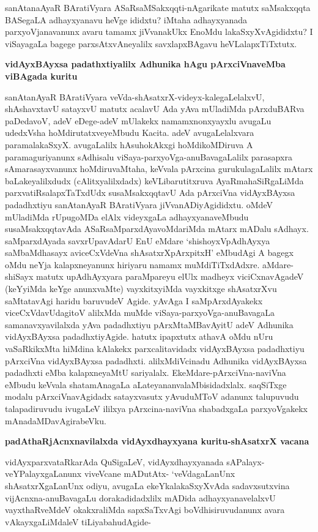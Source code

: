 sanAtanaAyaR BAratiVyara ASaRsaMSakxqqti-nAgarikate matutx saMsakxqqta BASegaLA adhayxyanavu heVge ididxtu? iMtaha adhayxyanada parxyoVjanavanunx avaru tamamx jiVvanakUkx EnoMdu lakaSxyXvAgididxtu? I viSayagaLa bagege parxsAtxvAneyalilx savxlapxBAgavu heVLalapxTiTxtutx.


\textbf{vidAyxBAyxsa padathxtiyalilx Adhunika hAgu pArxciVnaveMba viBAgada kuritu}

sanAtanAyaR BAratiVyara veVda-shAsatxrX-videyx-kalegaLelalxvU, shAshavxtavU satayxvU matutx acalavU Ada yAva mUladiMda pArxduBARva paDedavoV, adeV eDege-adeV mUlakekx namamxnonxyayxlu avugaLu udedxVsha hoMdirutatxveyeMbudu Kacita. adeV avugaLelalxvara paramalakaSxyX. avugaLalilx hAsuhokAkxgi hoMdikoMDiruva A paramaguriyanunx sAdhisalu viSaya-parxyoVga-anuBavagaLalilx parasapxra sAmarasayxvanunx hoMdiruvaMtaha, keVvala pArxcina gurukulagaLalilx mAtarx baLakeyalilxdudx (cAlitxyalilxdadx) keVLibarutitxruva AyaRmahaSiRgaLiMda parxvatiRsalapxTaTxdUdx susaMsakxqqtavU Ada pArxciVna vidAyxBAyxsa padadhxtiyu sanAtanAyaR BAratiVyara jiVvanADiyAgididxtu. oMdeV mUladiMda rUpugoMDa elAlx videyxgaLa adhayxyanaveMbudu susaMsakxqqtavAda ASaRsaMparxdAyavoMdariMda mAtarx
mADalu sAdhayx. saMparxdAyada savxrUpavAdarU EnU eMdare `shishoyxVpAdhAyxya saMbaMdhasayx aviceCxVdeVna shAsatxrXpArxpitxH' eMbudAgi A bagegx oMdu neYja kalapxneyanunx hiriyaru namamx muMdiTiTxdAdxre. aMdare-shiSayx matutx upAdhAyxyara paraMpareyu elUlx madheyx viciCxnavAgadeV (keYyiMda keYge anunxvaMte) vayxkitxyiMda vayxkitxge shAsatxrXvu saMtatavAgi haridu baruvudeV Agide. yAvAga I saMpArxdAyakekx viceCxVdavUdagitoV alilxMda muMde viSaya-parxyoVga-anuBavagaLa samanavxyavilalxda yAva padadhxtiyu pArxMtaMBavAyitU adeV Adhunika vidAyxBAyxsa padadhxtiyAgide. hatutx ipapxtutx athavA oMdu nUru vaSaRkikxMta hiMdina kAlakekx parxcalitavidadx vidAyxBAyxsa padadhxtiyu pArxciVna vidAyxBAyxsa padadhxti. alilxMdiVcinadu Adhunika vidAyxBAyxsa padadhxti eMba kalapxneyaMtU sariyalalx. EkeMdare-pArxciVna-naviVna eMbudu keVvala shatamAnagaLa aLateyananvalaMbisidadxlalx. saqSiTxge modalu pArxciVnavAgidadx satayxvasutx yAvuduMToV adanunx talupuvudu talapadiruvudu ivugaLeV ililxya pArxcina-naviVna shabadxgaLa parxyoVgakekx mAnadaMDavAgirabeVku.

\textbf{padAthaRjAcnxnavilalxda vidAyxdhayxyana kuritu-shAsatxrX vacana}

vidAyxparxvataRkarAda QuSigaLeV, vidAyxdhayxyanada sAPalayx-veYPalayxgaLanunx viveVcane mADutAtx- `veVdagaLanUnx shAsatxrXgaLanUnx odiyu, avugaLa ekeYkalakaSxyXvAda sadavxsutxvina vijAcnxna-anuBavagaLu dorakadidadxlilx mADida adhayxyanavelalxvU vayxthaRveMdeV okakxraliMda sapxSaTxvAgi boVdhisiruvudanunx
avara vAkayxgaLiMdaleV tiLiyabahudAgide-

